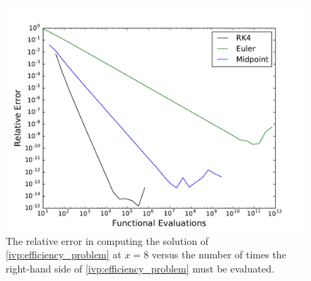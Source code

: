 \begin{figure}[H]
\centering
\includegraphics[width=\textwidth]{figures/Efficiency.pdf}
\caption{The relative error in computing the solution of \eqref{ivp:efficiency_problem} at $x = 8$ versus the number of times the right-hand side of \eqref{ivp:efficiency_problem} must be evaluated.  }
\label{ivp:efficiency_figure}
\end{figure}

